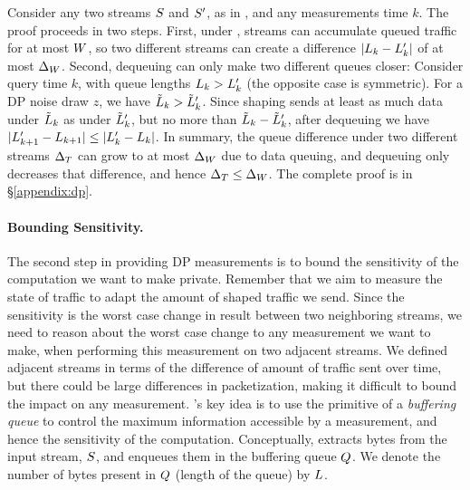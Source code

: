 \begin{proofsketch}
Consider any two streams $S$ and $S'$, as in ,
and any measurements time $k$.
The proof proceeds in two steps. First, under ,
streams can accumulate queued traffic for at most {$W$}, so two
different streams can create a difference $|L_{k} - L_{k}'|$ of at
most $\Delta_{W}$.
Second, dequeuing can only make two different queues closer: Consider
query time $k$, with queue lengths $L_{k} > L_{k}'$ (the
opposite case is symmetric).
For a DP noise draw $z$, we have $\tilde{L}_{k} > \tilde{L}_{k}'$. Since shaping
sends at least as much data under $\tilde{L}_{k}$ as under $\tilde{L}_{k}'$,
but no more than $\tilde{L}_{k} - \tilde{L}_{k}'$, after dequeuing we have
$|L_{k+1}' - L_{k+1}| \leq |L_{k}' - L_{k}|$.
In summary, the queue difference under two different streams
$\Delta_T$ can grow to at most $\Delta_{W}$ due to data queuing, and dequeuing only
decreases that difference, and hence $\Delta_T \leq \Delta_{W}$.  The complete
proof is in \S\ref{appendix:dp}.
\end{proofsketch}




\paragraph{Bounding Sensitivity.}
The second step in providing DP measurements is to bound the sensitivity of the
computation we want to make private. Remember that we aim to measure the state
of traffic to adapt the amount of shaped traffic we send.
Since the sensitivity is the worst case change in result between two neighboring
streams, we need to reason about the worst case change to any measurement we want
to make, when performing this measurement on two adjacent streams.
We defined adjacent streams in terms of the difference of amount of traffic sent
over time, but there could be large differences in packetization, making it
difficult to bound the impact on any measurement.
%
\sys's key idea is to use the primitive of a {\em buffering queue} to control
the maximum information accessible by a measurement, and hence the sensitivity
of the computation.
Conceptually, {\sys} extracts bytes from the input stream, $S$, and
enqueues them in the buffering queue $Q$.
We denote the number of bytes present in $Q$ (\ie length of the queue) by
$L$.

